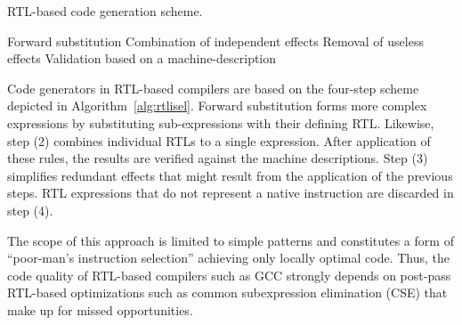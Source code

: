 \begin{algorithm}
\caption{RTL-based code generation scheme.}
\label{alg:rtlisel}
\begin{algorithmic}[1]
\STATE Forward substitution
\STATE Combination of independent effects
\STATE Removal of useless effects
\STATE Validation based on a machine-description
\end{algorithmic}
\end{algorithm}
Code generators in RTL-based compilers are based on the four-step
scheme depicted in Algorithm~\ref{alg:rtlisel}. Forward substitution
forms more complex expressions by substituting sub-expressions with
their defining RTL. Likewise, step (2) combines individual RTLs to a
single expression. After application of these rules, the results are
verified against the machine descriptions. Step (3) simplifies
redundant effects that might result from the application of the
previous steps. RTL expressions that do not represent a native
instruction are discarded in step (4).

The scope of this approach is limited to simple patterns and
constitutes a form of ``poor-man's instruction selection'' achieving
only locally optimal code. Thus, the code quality of RTL-based
compilers such as GCC strongly depends on post-pass RTL-based
optimizations such as common subexpression elimination (CSE) that make
up for missed opportunities.
